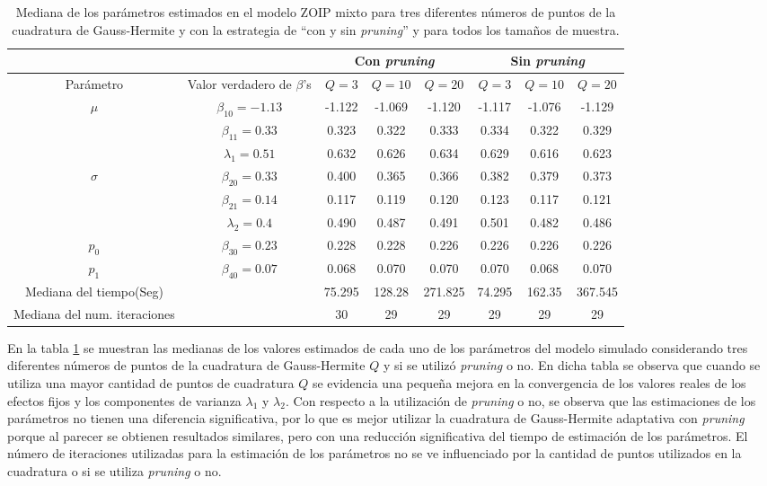 \begin{table}[!hbt]
{\scriptsize
\begin{center}
\begin{tabular}{|c|c|c|c|c|c|c|c|}\hline
& & \multicolumn{3}{|c|}{Con \textit{pruning}} & \multicolumn{3}{|c|}{Sin \textit{pruning}} \\ \hline
Par\'{a}metro & Valor verdadero de $\beta$'s & $Q=3$ & $Q=10$ & $Q=20$ & $Q=3$ & $Q=10$ & $Q=20$ \\ \hline \hline
\multirow{3}{*}{$\mu$} & $\beta_{10}=-1.13$ & -1.122	& -1.069	& -1.120	& -1.117	& -1.076	& -1.129 \\ 
& $\beta_{11}=0.33$& 0.323	&0.322	&0.333	&0.334	&0.322	&0.329 \\
& $\lambda_1=0.51$ & 0.632	&0.626	&0.634	&0.629	&0.616	&0.623 \\ \hline
\multirow{3}{*}{$\sigma$} & $\beta_{20}=0.33$ & 0.400	&0.365	&0.366	&0.382	&0.379	&0.373 \\ 
& $\beta_{21}=0.14$ & 0.117	&0.119	&0.120	&0.123	&0.117	&0.121 \\
& $\lambda_2=0.4$& 0.490	&0.487	&0.491	&0.501	&0.482	&0.486 \\ \hline
$p_0$& $\beta_{30}=0.23$ &0.228	&0.228	&0.226	&0.226	&0.226	&0.226 \\ \hline
$p_1$& $\beta_{40}=0.07$ &0.068	&0.070	&0.070	&0.070	&0.068	&0.070 \\ \hline
Mediana del tiempo(Seg)& &75.295	&128.28	&271.825	&74.295	&162.35	&367.545 \\ \hline
Mediana del num. iteraciones& &30	&29	&29	&29	&29	&29 \\ \hline
\end{tabular}
\caption{Mediana de los par\'{a}metros estimados en el modelo ZOIP mixto para tres diferentes n\'{u}meros de puntos de la cuadratura de Gauss-Hermite y con la estrategia de ``con y sin \textit{pruning}'' y para todos los tama\~{n}os de muestra.}
\label{T_Sim_mix_ncua}
\end{center}
}
\end{table}

En la tabla \ref{T_Sim_mix_ncua} se muestran las medianas de los valores estimados de cada uno de los par\'{a}metros del modelo simulado considerando tres diferentes n\'{u}meros de puntos de la cuadratura de Gauss-Hermite $Q$ y si se utiliz\'{o} \textit{pruning} o no. En dicha tabla se observa que cuando se utiliza una mayor cantidad de puntos de cuadratura $Q$ se evidencia una peque\~{n}a mejora en la convergencia de los valores reales de los efectos fijos y los componentes de varianza $\lambda_1$ y $\lambda_2$. Con respecto a la utilizaci\'{o}n de \textit{pruning} o no, se observa que las estimaciones de los par\'{a}metros no tienen una diferencia significativa, por lo que es mejor utilizar la cuadratura de Gauss-Hermite adaptativa con \textit{pruning} porque al parecer se obtienen resultados similares, pero con una reducci\'{o}n significativa del tiempo de estimaci\'{o}n de los par\'{a}metros. El n\'{u}mero de iteraciones utilizadas para la estimaci\'{o}n de los par\'{a}metros no se ve influenciado por la cantidad de puntos utilizados en la cuadratura o si se utiliza \textit{pruning} o no.\\

